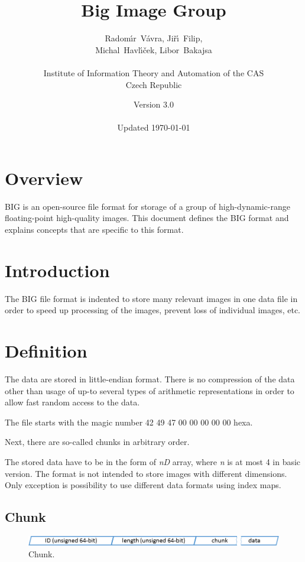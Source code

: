 \documentclass{article}
\title{Big Image Group}
\date{Version 3.0\\~\\Updated \today}
\author{Radom\'\i r~V\'avra, Ji\v r\'\i~Filip,\\Michal~Havl\'\i\v cek, Libor~Bakajsa\\\\Institute of Information Theory and Automation of the CAS\\Czech Republic}
\begin{document}
\maketitle

\section{Overview}
BIG is an open-source file format for storage of a group of high-dynamic-range floating-point high-quality images. This document defines the BIG format and explains concepts that are specific to this format.

\newpage

\tableofcontents

\newpage

\section{Introduction}

The BIG file format is indented to store many relevant images in one data file in order to speed up processing of the images, prevent loss of individual images, etc.

\section{Definition}

The data are stored in little-endian format. There is no compression of the data other than usage of up-to several types of arithmetic representations in order to allow fast random access to the data.

The file starts with the magic number 42 49 47 00 00 00 00 00 hexa.

Next, there are so-called chunks in arbitrary order.

The stored data have to be in the form of \textit{nD} array, where \textit{n} is at most 4 in basic version. The format is not intended to store images with different dimensions. Only exception is possibility to use different data formats using index maps.

\subsection{Chunk}

\begin{figure}[!ht]
\begin{center}
  \includegraphics[width=1.0\columnwidth]{chunk}
\end{center}
\caption{\label{fig:chunk}Chunk.}
\end{figure}
\end{document}

